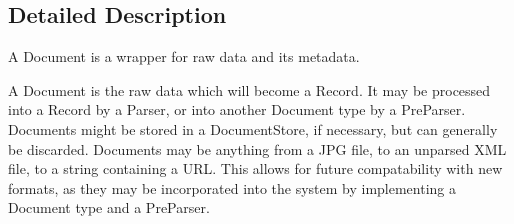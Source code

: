 \subsection{Detailed Description}
\begin{DoxyVerb}A Document is a wrapper for raw data and its metadata.

A Document is the raw data which will become a Record. It may be processed 
into a Record by a Parser, or into another Document type by a PreParser. 
Documents might be stored in a DocumentStore, if necessary, but can 
generally be discarded. Documents may be anything from a JPG file, to an 
unparsed XML file, to a string containing a URL. This allows for future 
compatability with new formats, as they may be incorporated into the 
system by implementing a Document type and a PreParser.
\end{DoxyVerb}
 

